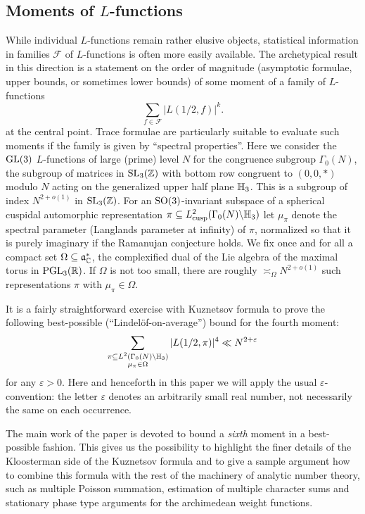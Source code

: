 \documentclass[11pt]{amsart}
\theoremstyle{plain}
\numberwithin{equation}{section}
\theoremstyle{definition}
\begin{document}
\subsection{Moments of $L$-functions} While individual $L$-functions remain   rather elusive objects, statistical information in families $\mathcal{F}$ of $L$-functions is often more easily available. The archetypical result in this direction is a statement on the order of magnitude (asymptotic formulae, upper bounds, or sometimes lower bounds) of some moment of a family of $L$-functions 
$$\sum_{f \in \mathcal{F}} |L(1/2, f)|^k.$$
at the central point. Trace formulae are particularly suitable to evaluate such moments if the family is given by ``spectral properties''.  Here we consider the  ${\rm GL}(3)$ $L$-functions of  large (prime) level $N$ for the congruence subgroup
$\Gamma_0(N)$, the subgroup of matrices in ${\rm SL}_3(\Bbb{Z})$ with bottom row congruent to $(0,  0, \ast)$ modulo $N$ acting on the generalized upper half plane $\Bbb{H}_3$.  This is a subgroup of index $N^{2+o(1)}$ in ${\rm SL}_3(\Bbb{Z})$. For an ${\rm SO(3)}$-invariant subspace of a spherical  cuspidal automorphic representation $\pi \subseteq L_{\text{cusp}}^2(\Gamma_0(N)\backslash \Bbb{H}_3)$  let $\mu_{\pi}$ denote the spectral parameter (Langlands parameter at infinity) of $\pi$, normalized so that it is purely imaginary if the Ramanujan conjecture holds. We fix once and for all a compact set $\Omega \subseteq \mathfrak{a}_{\Bbb{C}}^{\ast}$, the complexified dual of the Lie algebra of the maximal torus in ${\rm PGL}_3(\Bbb{R})$.  If $\Omega$ is not too small, there are roughly $\asymp_{\Omega} N^{2+o(1)}$  such representations $\pi$ with $\mu_{\pi} \in \Omega$. 

It is a fairly straightforward exercise with Kuznetsov formula to prove the following  best-possible (``Lindel\"of-on-average'') bound for the fourth moment:
$$\sum_{\substack{\pi \subseteq L^2(\Gamma_0(N)\backslash \Bbb{H}_3)\\ \mu_{\pi} \in \Omega}} |L(1/2, \pi)|^4 \ll N^{2+\varepsilon}$$
for any $\varepsilon >0$. Here and henceforth in  this paper we will apply the usual $\varepsilon$-convention: the letter $\varepsilon$ denotes an arbitrarily small real number, not necessarily the same on each occurrence. 

The main work of the paper is devoted to bound a \emph{sixth} moment in a best-possible fashion.  This gives us the possibility to highlight the finer details of the Kloosterman side of the Kuznetsov formula and to give a sample argument how to combine this formula with the rest of the machinery of analytic number theory, such as multiple Poisson summation, estimation of multiple character sums and stationary phase type arguments for the archimedean weight functions. 
\end{document}
